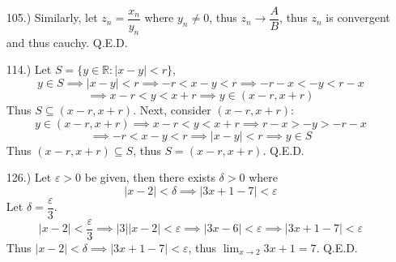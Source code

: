 \documentclass[12pt]{article}
\newcommand{\vertb}[1]{\left\vert#1\right\vert}
\newcommand{\e}{\varepsilon}
\newcommand{\lm}[1]{\displaystyle\lim_{#1}}
\begin{document}
\begin{itemize}
    \item [105.)] Similarly, let $z_n=\dfrac{x_n}{y_n}$ where $y_n\neq0$, thus $z_n\to\dfrac{A}{B}$, thus $z_n$ is convergent and thus cauchy. Q.E.D.








    \item [114.)] Let $S=\{y\in\mathbb{R}:\vertb{x-y}<r\}$,
    \[y\in S\implies\vertb{x-y}<r\implies-r<x-y<r\implies -r-x<-y<r-x\]
    \[\implies x-r<y<x+r\implies y\in(x-r,x+r)\]
    Thus $S\subseteq(x-r,x+r)$. Next, consider $(x-r,x+r)$:
    \[y\in(x-r,x+r)\implies x-r<y<x+r\implies r-x>-y>-r-x\]
    \[\implies -r<x-y<r\implies\vertb{x-y}<r\implies y\in S\]
    Thus $(x-r,x+r)\subseteq S$, thus $S=(x-r,x+r)$. Q.E.D.







    \item [126.)] Let $\e>0$ be given, then there exists $\delta>0$ where
    \[\vertb{x-2}<\delta\implies\vertb{3x+1-7}<\e\]
    Let $\delta=\dfrac{\e}{3}$.
    \[\vertb{x-2}<\frac{\e}{3}\implies\vertb{3}\vertb{x-2}<\e\implies\vertb{3x-6}<\e\implies\vertb{3x+1-7}<\e\]
    Thus $\vertb{x-2}<\delta\implies\vertb{3x+1-7}<\e$, thus $\displaystyle\lim_{x\to2}3x+1=7$. Q.E.D.



\end{itemize}
\end{document}
